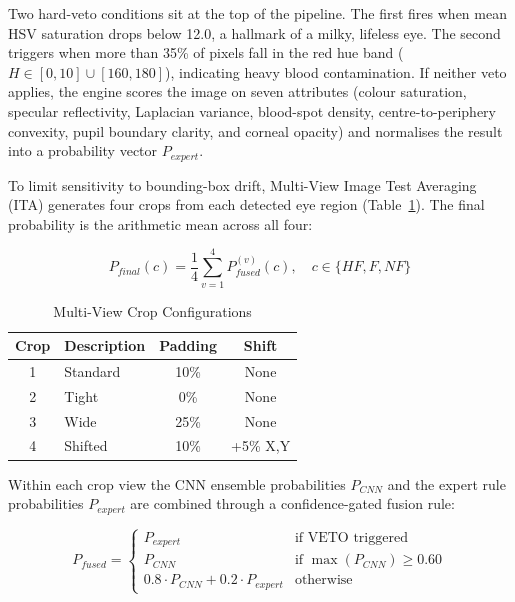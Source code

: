 \documentclass[conference]{IEEEtran}
\begin{document}
Two hard-veto conditions sit at the top of the pipeline. The first fires when mean HSV saturation drops below 12.0, a hallmark of a milky, lifeless eye. The second triggers when more than 35\% of pixels fall in the red hue band ($H \in [0,10] \cup [160,180]$), indicating heavy blood contamination. If neither veto applies, the engine scores the image on seven attributes (colour saturation, specular reflectivity, Laplacian variance, blood-spot density, centre-to-periphery convexity, pupil boundary clarity, and corneal opacity) and normalises the result into a probability vector $P_{expert}$.

To limit sensitivity to bounding-box drift, Multi-View Image Test Averaging (ITA) generates four crops from each detected eye region (Table~\ref{tab:crops}). The final probability is the arithmetic mean across all four:

\begin{equation}
P_{final}(c) = \frac{1}{4} \sum_{v=1}^{4} P_{fused}^{(v)}(c), \quad c \in \{HF, F, NF\}
\end{equation}

\begin{table}[h]
\centering
\caption{Multi-View Crop Configurations}
\label{tab:crops}
\begin{tabular}{clcc}
\toprule
\textbf{Crop} & \textbf{Description} & \textbf{Padding} & \textbf{Shift} \\
\midrule
1 & Standard & 10\% & None \\
2 & Tight & 0\% & None \\
3 & Wide & 25\% & None \\
4 & Shifted & 10\% & +5\% X,Y \\
\bottomrule
\end{tabular}
\end{table}

Within each crop view the CNN ensemble probabilities $P_{CNN}$ and the expert rule probabilities $P_{expert}$ are combined through a confidence-gated fusion rule:

\begin{equation}
P_{fused} = 
\begin{cases}
P_{expert} & \text{if VETO triggered} \\
P_{CNN} & \text{if } \max(P_{CNN}) \geq 0.60 \\
0.8 \cdot P_{CNN} + 0.2 \cdot P_{expert} & \text{otherwise}
\end{cases}
\end{equation}
\end{document}
